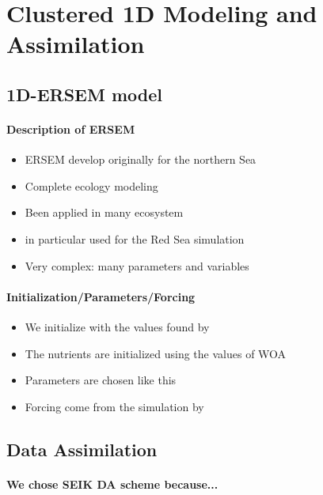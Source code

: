 \section{Clustered 1D Modeling and Assimilation}

\subsection{1D-ERSEM model}

\paragraph{Description of ERSEM}

\begin{itemize}
  \item ERSEM develop originally for the northern Sea
  \item Complete ecology modeling
  \item Been applied in many ecosystem
  \item in particular used for the Red Sea simulation \citet{Triantafyllou2013}
  \item Very complex: many parameters and variables
\end{itemize}

\paragraph{Initialization/Parameters/Forcing}

\begin{itemize}
  \item We initialize with the values found by \citet{Triantafyllou2013}
  \item The nutrients are initialized using the values of WOA
  \item Parameters are chosen like this
  \item Forcing come from the simulation by \citet{Yao2014b, Yao2014}
\end{itemize}

\subsection{Data Assimilation}

\paragraph{We chose SEIK DA scheme because...}

